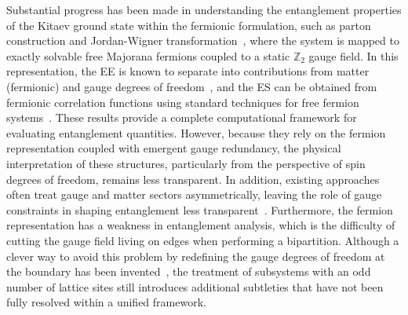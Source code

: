 Substantial progress has been made in understanding the entanglement properties of the Kitaev ground state within the fermionic formulation, such as parton construction and Jordan-Wigner transformation~\cite{Kitaev_2006, Burnell-Nayak_2011, Feng-Zhang-Xiang_2007, Chen-Hu_2007, Chen-Nussinov_2008, Fu-Knolle-Perkins-2018}, where the system is mapped to exactly solvable free Majorana fermions coupled to a static $\mathbb{Z}_2$ gauge field. 
%
In this representation, the EE is known to separate into contributions from matter (fermionic) and gauge degrees of freedom~\cite{Yao-Qi_2010}, and the ES can be obtained from fermionic correlation functions using standard techniques for free fermion systems~\cite{Jin-Korepin_2004, Vidal-Latorre-Rico-Kitaev_2003, Latorre-Rico-Vidal_2004, Peschel_2003, Peschel-Eisler_2009, Chung-Peschel_2001, Cheong-Henley_2004}. 
%
These results provide a complete computational framework for evaluating entanglement quantities. 
%
However, because they rely on the fermion representation coupled with emergent gauge redundancy, the physical interpretation of these structures, particularly from the perspective of spin degrees of freedom, remains less transparent. In addition, existing approaches often treat gauge and matter sectors asymmetrically, leaving the role of gauge constraints in shaping entanglement less transparent~\cite{Yao-Qi_2010, Kitaev-entanglement-1, Kitaev-entanglement-2}.
%
Furthermore, the fermion representation has a weakness in entanglement analysis, which is the difficulty of cutting the gauge field living on edges when performing a bipartition. Although a clever way to avoid this problem by redefining the gauge degrees of freedom at the boundary has been invented~\cite{Yao-Qi_2010}, the treatment of subsystems with an odd number of lattice sites still introduces additional subtleties that have not been fully resolved within a unified framework.
